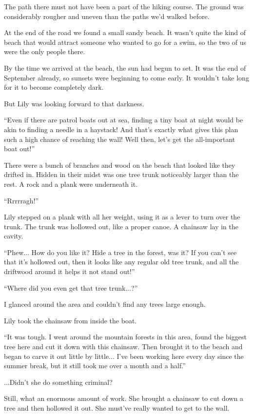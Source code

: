The path there must not have been a part of the hiking course. The ground was considerably rougher and uneven than the paths we'd walked before.

At the end of the road we found a small sandy beach. It wasn't quite the kind of beach that would attract someone who wanted to go for a swim, so the two of us were the only people there.

By the time we arrived at the beach, the sun had begun to set. It was the end of September already, so sunsets were beginning to come early. It wouldn't take long for it to become completely dark.

But Lily was looking forward to that darkness.

``Even if there are patrol boats out at sea, finding a tiny boat at night would be akin to finding a needle in a haystack! And that's exactly what gives this plan such a high chance of reaching the wall! Well then, let's get the all-important boat out!''

There were a bunch of branches and wood on the beach that looked like they drifted in. Hidden in their midst was one tree trunk noticeably larger than the rest. A rock and a plank were underneath it.

``Rrrrragh!''

Lily stepped on a plank with all her weight, using it as a lever to turn over the trunk. The trunk was hollowed out, like a proper canoe. A chainsaw lay in the cavity.

``Phew... How do you like it? Hide a tree in the forest, was it? If you can't see that it's hollowed out, then it looks like any regular old tree trunk, and all the driftwood around it helps it not stand out!''

``Where did you even get that tree trunk...?''

I glanced around the area and couldn't find any trees large enough.

Lily took the chainsaw from inside the boat.

``It was tough. I went around the mountain forests in this area, found the biggest tree here and cut it down with this chainsaw. Then brought it to the beach and began to carve it out little by little... I've been working here every day since the summer break, but it still took me over a month and a half.''

...Didn't she do something criminal?

Still, what an enormous amount of work. She brought a chainsaw to cut down a tree and then hollowed it out. She must've really wanted to get to the wall.

